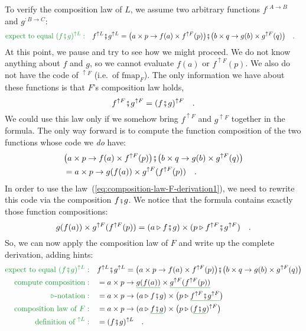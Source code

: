 To verify the composition law of $L$, we assume two arbitrary functions
$f^{:A\rightarrow B}$ and $g^{:B\rightarrow C}$:
\begin{align*}
{\color{greenunder}\text{expect to equal }(f\bef g)^{\uparrow L}:}\quad & f^{\uparrow L}\bef g^{\uparrow L}=\big(a\times p\rightarrow f(a)\times f^{\uparrow F}(p)\big)\bef\big(b\times q\rightarrow g(b)\times g^{\uparrow F}(q)\big)\quad.
\end{align*}
At this point, we pause and try to see how we might proceed. We do
not know anything about $f$ and $g$, so we cannot evaluate $f(a)$
or $f^{\uparrow F}(p)$. We also do not have the code of $^{\uparrow F}$
(i.e.~of $\text{fmap}_{F}$). The only information we have about
these functions is that $F$'s composition law holds,
\begin{equation}
f^{\uparrow F}\bef g^{\uparrow F}=(f\bef g)^{\uparrow F}\quad.\label{eq:composition-law-F-derivation1}
\end{equation}
We could use this law only if we somehow bring $f^{\uparrow F}$ and
$g^{\uparrow F}$ together in the formula. The only way forward is
to compute the function composition of the two functions whose code
we \emph{do} have:
\begin{align*}
 & \big(a\times p\rightarrow f(a)\times f^{\uparrow F}(p)\big)\bef\big(b\times q\rightarrow g(b)\times g^{\uparrow F}(q)\big)\\
 & =a\times p\rightarrow g(f(a))\times g^{\uparrow F}(f^{\uparrow F}(p))\quad.
\end{align*}
In order to use the law~(\ref{eq:composition-law-F-derivation1}),
we need to rewrite this code via the composition $f\bef g$. We notice
that the formula contains exactly those function compositions:
\[
g(f(a))\times g^{\uparrow F}(f^{\uparrow F}(p))=(a\triangleright f\bef g)\times(p\triangleright f^{\uparrow F}\bef g^{\uparrow F})\quad.
\]
So, we can now apply the composition law of $F$ and write up the
complete derivation, adding hints:
\begin{align*}
{\color{greenunder}\text{expect to equal }(f\bef g)^{\uparrow L}:}\quad & f^{\uparrow L}\bef g^{\uparrow L}=\big(a\times p\rightarrow f(a)\times f^{\uparrow F}(p)\big)\bef\big(b\times q\rightarrow g(b)\times g^{\uparrow F}(q)\big)\\
{\color{greenunder}\text{compute composition}:}\quad & =a\times p\rightarrow\gunderline{g(f(a))}\times\gunderline{g^{\uparrow F}(f^{\uparrow F}(p))}\\
{\color{greenunder}\triangleright\text{-notation}:}\quad & =a\times p\rightarrow(a\triangleright f\bef g)\times\big(p\triangleright\gunderline{f^{\uparrow F}\bef g^{\uparrow F}}\big)\\
{\color{greenunder}\text{composition law of }F:}\quad & =a\times p\rightarrow(a\triangleright\gunderline{f\bef g})\times\big(p\triangleright(\gunderline{f\bef g})^{\uparrow F}\big)\\
{\color{greenunder}\text{definition of }^{\uparrow L}:}\quad & =(f\bef g)^{\uparrow L}\quad.
\end{align*}

